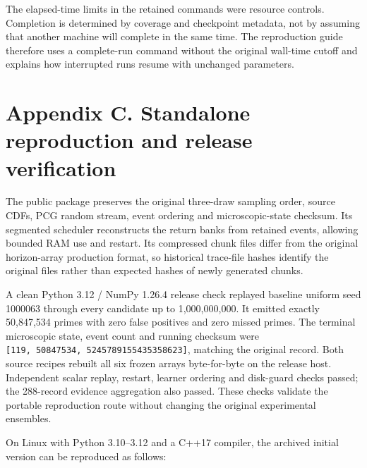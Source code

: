 \documentclass[
  11pt,
]{article}
\begin{document}
The elapsed-time limits in the retained commands were resource controls.
Completion is determined by coverage and checkpoint metadata, not by
assuming that another machine will complete in the same time. The
reproduction guide therefore uses a complete-run command without the
original wall-time cutoff and explains how interrupted runs resume with
unchanged parameters.

\section{Appendix C. Standalone reproduction and release
verification}\label{appendix-c.-standalone-reproduction-and-release-verification}

The public package preserves the original three-draw sampling order,
source CDFs, PCG random stream, event ordering and microscopic-state
checksum. Its segmented scheduler reconstructs the return banks from
retained events, allowing bounded RAM use and restart. Its compressed
chunk files differ from the original horizon-array production format, so
historical trace-file hashes identify the original files rather than
expected hashes of newly generated chunks.

A clean Python 3.12 / NumPy 1.26.4 release check replayed baseline
uniform seed 1000063 through every candidate up to 1,000,000,000. It
emitted exactly 50,847,534 primes with zero false positives and zero
missed primes. The terminal microscopic state, event count and running
checksum were \texttt{{[}119,\ 50847534,\ 5245789155435358623{]}},
matching the original record. Both source recipes rebuilt all six frozen
arrays byte-for-byte on the release host. Independent scalar replay,
restart, learner ordering and disk-guard checks passed; the 288-record
evidence aggregation also passed. These checks validate the portable
reproduction route without changing the original experimental ensembles.

On Linux with Python 3.10--3.12 and a C++17 compiler, the archived
initial version can be reproduced as follows:
\end{document}
